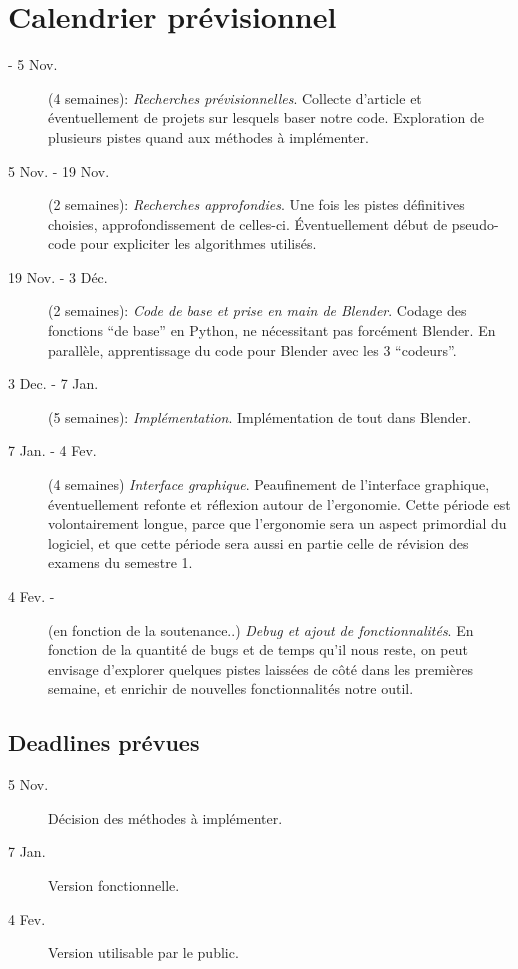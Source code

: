 \documentclass[a4paper,12pt]{article}
\begin{document}
\section{Calendrier prévisionnel}
\begin{description}
  \item[- 5 Nov.] (4 semaines):  \textit{Recherches prévisionnelles}. Collecte d'article et éventuellement de projets sur lesquels baser notre code. Exploration de plusieurs pistes quand aux méthodes à implémenter.
  \item[5 Nov. - 19 Nov.] (2 semaines): \textit{Recherches approfondies}. Une fois les pistes définitives choisies, approfondissement de celles-ci. Éventuellement début de pseudo-code pour expliciter les algorithmes utilisés.
  \item[19 Nov. - 3 Déc.] (2 semaines): \textit{Code de base et prise en main de Blender}. Codage des fonctions ``de base'' en Python, ne nécessitant pas forcément Blender. En parallèle, apprentissage du code pour Blender avec les 3 ``codeurs''.
  \item[3 Dec. - 7 Jan.] (5 semaines): \textit{Implémentation}. Implémentation de tout dans Blender.
  \item[7 Jan. - 4 Fev.] (4 semaines) \textit{Interface graphique}. Peaufinement de l'interface graphique, éventuellement refonte et réflexion autour de l'ergonomie. Cette période est volontairement longue, parce que l'ergonomie sera un aspect primordial du logiciel, et que cette période sera aussi en partie celle de révision des examens du semestre 1.
  \item[4 Fev. -] (en fonction de la soutenance..) \textit{Debug et ajout de fonctionnalités}.
  En fonction de la quantité de bugs et de temps qu'il nous reste, on peut envisage d'explorer quelques pistes laissées de côté dans les premières semaine, et enrichir de nouvelles fonctionnalités notre outil.
\end{description}

\subsection*{Deadlines prévues}
\begin{description}
  \item[5 Nov.] Décision des méthodes à implémenter. 
  \item[7 Jan.] Version fonctionnelle.
  \item[4 Fev.] Version utilisable par le public.
\end{description}
\end{document}
